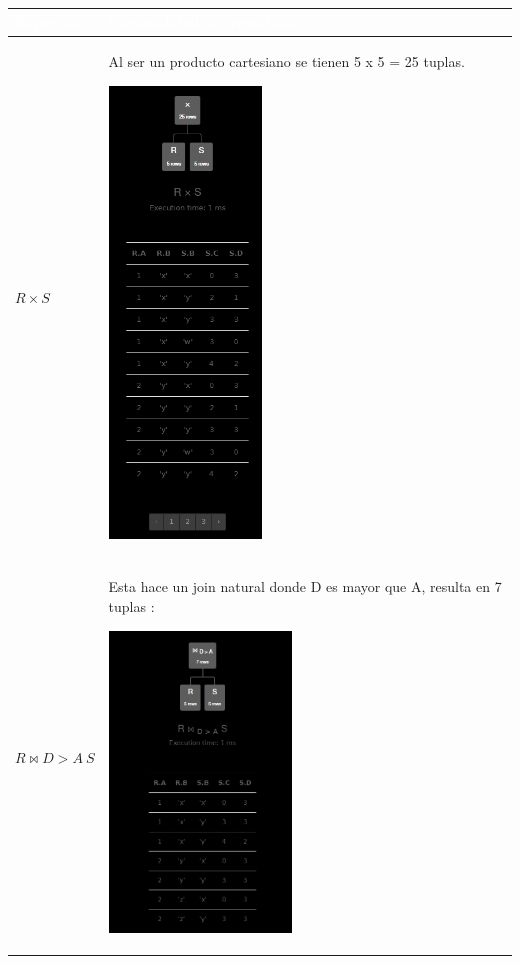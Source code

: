 


\begin{longtable}{|p{4.3cm}|p{12cm}|}
    \hline
    \rowcolor{blue!50}
    \textcolor{white}{\textbf{Expresión}} & \textcolor{white}{\textbf{Cardinalidad del resultado}} \\ \hline
    \textbf{$R \times S$} & 
    Al ser un producto cartesiano se tienen 5 x 5 = 25 tuplas. 

    \begin{center}
        \includegraphics[height=12cm]{../resources/pregunta1/1.1.png}
    \end{center}
    \\ \hline
    
    \textbf{$R \bowtie D > A \ S$} & 
    Esta hace un join natural donde D es mayor que A, resulta en 7 tuplas : 

    \begin{center}
        \includegraphics[height=8cm]{../resources/pregunta1/1.2.png}
    \end{center}
    \\ \hline
    

\end{longtable}
